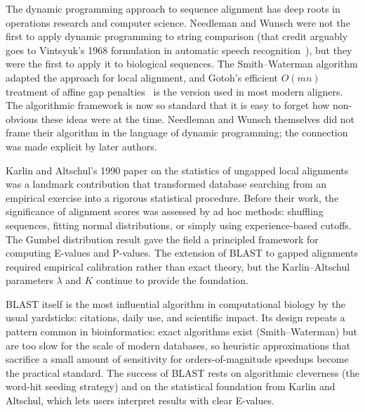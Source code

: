 The dynamic programming approach to sequence alignment has deep roots in operations research and computer science. Needleman and Wunsch \cite{needleman1970} were not the first to apply dynamic programming to string comparison (that credit arguably goes to Vintsyuk's 1968 formulation in automatic speech recognition~\cite{vintsyuk1968}), but they were the first to apply it to biological sequences. The Smith--Waterman algorithm \cite{smith1981} adapted the approach for local alignment, and Gotoh's efficient $O(mn)$ treatment of affine gap penalties~\cite{gotoh1982} is the version used in most modern aligners. The algorithmic framework is now so standard that it is easy to forget how non-obvious these ideas were at the time. Needleman and Wunsch themselves did not frame their algorithm in the language of dynamic programming; the connection was made explicit by later authors.

Karlin and Altschul's 1990 paper \cite{karlin1990} on the statistics of ungapped local alignments was a landmark contribution that transformed database searching from an empirical exercise into a rigorous statistical procedure. Before their work, the significance of alignment scores was assessed by ad hoc methods: shuffling sequences, fitting normal distributions, or simply using experience-based cutoffs. The Gumbel distribution result gave the field a principled framework for computing E-values and P-values. The extension of BLAST to gapped alignments \cite{altschul1997} required empirical calibration rather than exact theory, but the Karlin--Altschul parameters $\lambda$ and $K$ continue to provide the foundation.

BLAST itself \cite{altschul1990} is the most influential algorithm in computational biology by the usual yardsticks: citations, daily use, and scientific impact. Its design repeats a pattern common in bioinformatics: exact algorithms exist (Smith--Waterman) but are too slow for the scale of modern databases, so heuristic approximations that sacrifice a small amount of sensitivity for orders-of-magnitude speedups become the practical standard. The success of BLAST rests on algorithmic cleverness (the word-hit seeding strategy) and on the statistical foundation from Karlin and Altschul, which lets users interpret results with clear E-values.

\endinput
